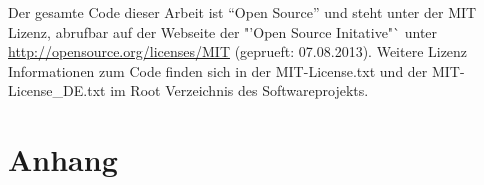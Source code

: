 \documentclass[pagesize, paper=a4, fontsize=12pt,titlepage=true, headings=small, headnosepline, abstractoff, liststotoc, nochapterprefix, plainheadsepline]{scrreprt}
\begin{document}
Der gesamte Code dieser Arbeit ist "`Open Source"' und steht unter der MIT Lizenz, abrufbar auf der Webseite der "'Open Source Initative"` unter \url{http://opensource.org/licenses/MIT} (geprueft: 07.08.2013). Weitere Lizenz Informationen zum Code finden sich in der MIT-License.txt und der MIT-License\_DE.txt im Root Verzeichnis des Softwareprojekts.



\part*{Anhang}


\lstlistoflistings

\listoftables

\listoffigures

\nocite{*}

\newpage
\end{document}
